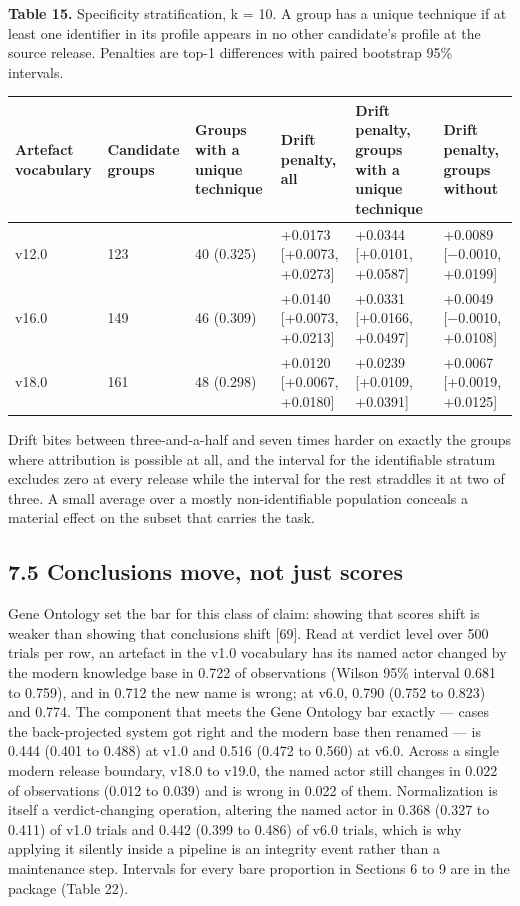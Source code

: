 \documentclass[11pt,a4paper]{article}
\begin{document}
\textbf{Table 15.} Specificity stratification, k = 10. A group has a unique technique if at least one identifier in its profile appears in no other candidate's profile at the source release. Penalties are top-1 differences with paired bootstrap 95\% intervals.

\begin{center}\footnotesize
\begin{tabular}{llllll}
\toprule
Artefact vocabulary & Candidate groups & Groups with a unique technique & Drift penalty, all & Drift penalty, groups with a unique technique & Drift penalty, groups without \\
\midrule
v12.0 & 123 & 40 (0.325) & +0.0173 [+0.0073, +0.0273] & +0.0344 [+0.0101, +0.0587] & +0.0089 [−0.0010, +0.0199] \\
v16.0 & 149 & 46 (0.309) & +0.0140 [+0.0073, +0.0213] & +0.0331 [+0.0166, +0.0497] & +0.0049 [−0.0010, +0.0108] \\
v18.0 & 161 & 48 (0.298) & +0.0120 [+0.0067, +0.0180] & +0.0239 [+0.0109, +0.0391] & +0.0067 [+0.0019, +0.0125] \\
\bottomrule
\end{tabular}
\end{center}

Drift bites between three-and-a-half and seven times harder on exactly the groups where attribution is possible at all, and the interval for the identifiable stratum excludes zero at every release while the interval for the rest straddles it at two of three. A small average over a mostly non-identifiable population conceals a material effect on the subset that carries the task.

\subsection{7.5 Conclusions move, not just scores}

Gene Ontology set the bar for this class of claim: showing that scores shift is weaker than showing that conclusions shift [69]. Read at verdict level over 500 trials per row, an artefact in the v1.0 vocabulary has its named actor changed by the modern knowledge base in 0.722 of observations (Wilson 95\% interval 0.681 to 0.759), and in 0.712 the new name is wrong; at v6.0, 0.790 (0.752 to 0.823) and 0.774. The component that meets the Gene Ontology bar exactly — cases the back-projected system got right and the modern base then renamed — is 0.444 (0.401 to 0.488) at v1.0 and 0.516 (0.472 to 0.560) at v6.0. Across a single modern release boundary, v18.0 to v19.0, the named actor still changes in 0.022 of observations (0.012 to 0.039) and is wrong in 0.022 of them. Normalization is itself a verdict-changing operation, altering the named actor in 0.368 (0.327 to 0.411) of v1.0 trials and 0.442 (0.399 to 0.486) of v6.0 trials, which is why applying it silently inside a pipeline is an integrity event rather than a maintenance step. Intervals for every bare proportion in Sections 6 to 9 are in the package (Table 22).
\end{document}
